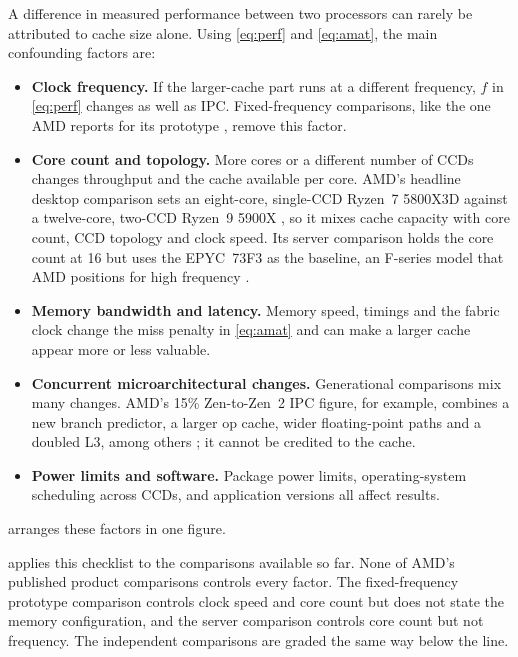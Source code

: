 A difference in measured performance between two processors can rarely be attributed to cache size alone. Using \cref{eq:perf} and \cref{eq:amat}, the main confounding factors are:
\begin{itemize}
  \item \textbf{Clock frequency.} If the larger-cache part runs at a different frequency, $f$ in \cref{eq:perf} changes as well as IPC. Fixed-frequency comparisons, like the one AMD reports for its prototype \cite{swaminathanAdvancedPackagingEnabling2021}, remove this factor.
  \item \textbf{Core count and topology.} More cores or a different number of CCDs changes throughput and the cache available per core. AMD's headline desktop comparison sets an eight-core, single-CCD Ryzen~7 5800X3D against a twelve-core, two-CCD Ryzen~9 5900X \cite[slide~29]{wuu2022vcache}, so it mixes cache capacity with core count, CCD topology and clock speed. Its server comparison holds the core count at 16 but uses the EPYC~73F3 as the baseline, an F-series model that AMD positions for high frequency \cite{amd2022epyc7003,wuu2022vcache}.
  \item \textbf{Memory bandwidth and latency.} Memory speed, timings and the fabric clock change the miss penalty in \cref{eq:amat} and can make a larger cache appear more or less valuable.
  \item \textbf{Concurrent microarchitectural changes.} Generational comparisons mix many changes. AMD's 15\% Zen-to-Zen~2 IPC figure, for example, combines a new branch predictor, a larger op cache, wider floating-point paths and a doubled L3, among others \cite{suggs2019zen2}; it cannot be credited to the cache.
  \item \textbf{Power limits and software.} Package power limits, operating-system scheduling across CCDs, and application versions all affect results.
\end{itemize}

 arranges these factors in one figure.



 applies this checklist to the comparisons available so far. None of AMD's published product comparisons controls every factor. The fixed-frequency prototype comparison controls clock speed and core count but does not state the memory configuration, and the server comparison controls core count but not frequency. The independent comparisons are graded the same way below the line.

